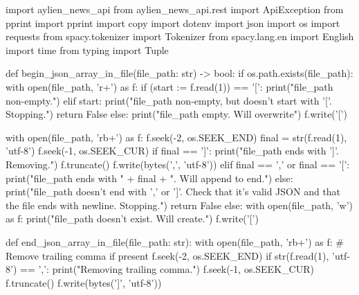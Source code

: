 
\begin{pyin}
import aylien_news_api
from aylien_news_api.rest import ApiException
from pprint import pprint
import copy
import dotenv
import json
import os
import requests
from spacy.tokenizer import Tokenizer
from spacy.lang.en import English
import time
from typing import Tuple
\end{pyin}

\begin{pyin}
def begin_json_array_in_file(file_path: str) -> bool:
    if os.path.exists(file_path):
        with open(file_path, 'r+') as f:
            if (start := f.read(1)) == '[':
                print("file_path non-empty.")
            elif start:
                print("file_path non-empty, but doesn't start with '['. Stopping.")
                return False
            else:
                print("file_path empty. Will overwrite")
                f.write('[\n')

        with open(file_path, 'rb+') as f:
            f.seek(-2, os.SEEK_END)
            final = str(f.read(1), 'utf-8')
            f.seek(-1, os.SEEK_CUR)
            if final == ']':
                print("file_path ends with ']'. Removing.")
                f.truncate()
                f.write(bytes(',\n', 'utf-8'))
            elif final == ',' or final == '[':
                print("file_path ends with " + final + ". Will append to end.")
            else:
                print("file_path doesn't end with ',' or ']'. Check that it's valid JSON and that the file ends with newline. Stopping.")
                return False
    else:
        with open(file_path, 'w') as f:
            print("file_path doesn't exist. Will create.")
            f.write('[\n')
\end{pyin}

\begin{pyin}
def end_json_array_in_file(file_path: str):
    with open(file_path, 'rb+') as f:
        # Remove trailing comma if present
        f.seek(-2, os.SEEK_END)
        if str(f.read(1), 'utf-8') == ',':
            print("Removing trailing comma.")
            f.seek(-1, os.SEEK_CUR)
            f.truncate()
            f.write(bytes('\n]\n', 'utf-8'))
\end{pyin}

